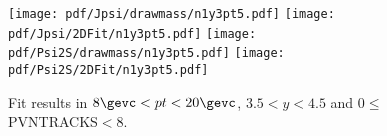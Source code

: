 \begin{figure}[H]
\begin{center}
\texttt{[image: pdf/Jpsi/drawmass/n1y3pt5.pdf]}
\texttt{[image: pdf/Jpsi/2DFit/n1y3pt5.pdf]}
\vspace*{-0.5cm}
\texttt{[image: pdf/Psi2S/drawmass/n1y3pt5.pdf]}
\texttt{[image: pdf/Psi2S/2DFit/n1y3pt5.pdf]}
\vspace*{-0.5cm}
\end{center}
\caption{Fit results in $8\gevc<pt<20\gevc$, $3.5<y<4.5$ and 0$\leq$PVNTRACKS$<$8.}
\label{Fitn1y3pt5}
\end{figure}
